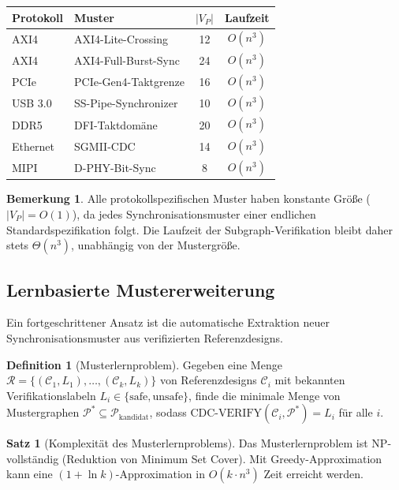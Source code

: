 ﻿\documentclass[a4paper,12pt]{article}
\theoremstyle{definition}
\newtheorem{definition}{Definition}
\newtheorem{satz}{Satz}
\newtheorem{bemerkung}{Bemerkung}
\begin{document}
	\begin{center}
		\begin{tabular}{|l|l|c|c|}
			\hline
			\textbf{Protokoll} & \textbf{Muster} & $|V_P|$ & \textbf{Laufzeit} \\
			\hline
			AXI4 & AXI4-Lite-Crossing & 12 & $O(n^3)$ \\
			AXI4 & AXI4-Full-Burst-Sync & 24 & $O(n^3)$ \\
			PCIe & PCIe-Gen4-Taktgrenze & 16 & $O(n^3)$ \\
			USB 3.0 & SS-Pipe-Synchronizer & 10 & $O(n^3)$ \\
			DDR5 & DFI-Taktdom\"ane & 20 & $O(n^3)$ \\
			Ethernet & SGMII-CDC & 14 & $O(n^3)$ \\
			MIPI & D-PHY-Bit-Sync & 8  & $O(n^3)$ \\
			\hline
		\end{tabular}
	\end{center}
	
	\begin{bemerkung}
		Alle protokollspezifischen Muster haben konstante Gr\"o\ss{}e ($|V_P| = O(1)$),
		da jedes Synchronisationsmuster einer endlichen Standardspezifikation folgt.
		Die Laufzeit der Subgraph-Verifikation bleibt daher stets $\Theta(n^3)$,
		unabh\"angig von der Mustergr\"o\ss{}e.
	\end{bemerkung}
	
	\subsection{Lernbasierte Mustererweiterung}
	
	Ein fortgeschrittener Ansatz ist die automatische Extraktion neuer
	Synchronisationsmuster aus verifizierten Referenzdesigns.
	
	\begin{definition}[Musterlernproblem]
		Gegeben eine Menge $\mathcal{R} = \{(\mathcal{C}_1, L_1), \ldots, (\mathcal{C}_k, L_k)\}$
		von Referenzdesigns $\mathcal{C}_i$ mit bekannten Verifikationslabeln
		$L_i \in \{\mathrm{safe}, \mathrm{unsafe}\}$, finde die minimale Menge
		von Mustergraphen $\mathcal{P}^* \subseteq \mathcal{P}_{\mathrm{kandidat}}$,
		sodass $\mathrm{CDC\text{-}VERIFY}(\mathcal{C}_i, \mathcal{P}^*) = L_i$
		f\"ur alle $i$.
	\end{definition}
	
	\begin{satz}[Komplexit\"at des Musterlernproblems]
		Das Musterlernproblem ist NP-vollst\"andig (Reduktion von Minimum Set Cover).
		Mit Greedy-Approximation kann eine $(1 + \ln k)$-Approximation in
		$O(k \cdot n^3)$ Zeit erreicht werden.
	\end{satz}
	
\end{document}
